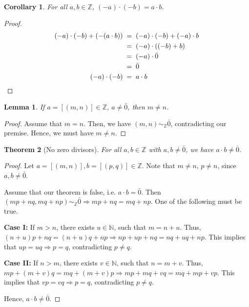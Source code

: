 \documentclass[10pt]{article}
\newtheorem{theorem}{Theorem}[section]
\newtheorem{lemma}[theorem]{Lemma}
\newtheorem{corollary}{Corollary}[theorem]
\theoremstyle{definition}
\theoremstyle{remark}
\begin{document}
        \begin{corollary}
                For all $a, b \in \mathbb{Z}$, $(-a)\cdot(-b) = a\cdot b$.
        \end{corollary}
        \begin{proof}
                \begin{align*}
                        (-a)\cdot(-b) + (-(a\cdot b)) \;&=\; (-a)\cdot(-b) + (-a)\cdot b\\
                                \;&=\; (-a)\cdot((-b) + b) \\
                                \;&=\; (-a)\cdot \bar{0} \\
                                \;&=\; \bar{0}\\
                        (-a)\cdot(-b) \;&=\; a\cdot b \qedhere
                \end{align*}
        \end{proof}

        \begin{lemma}
                If $a = [(m, n)] \in \mathbb{Z}$, $a \neq \bar{0}$, then $m \neq n$.
        \end{lemma}
        \begin{proof}
                Assume that $m = n$. Then, we have $(m, n) \sim_{\mathbb{Z}} \bar{0}$,
                contradicting our premise. Hence, we must have $m\neq n$.
        \end{proof}
        \begin{theorem}[No zero divisors]
                For all $a, b \in \mathbb{Z}$ with $a,b \neq \bar{0}$, we have $a\cdot b \neq \bar{0}$.
        \end{theorem}
        \begin{proof}
                Let $a = [(m, n)], b = [(p, q)] \in \mathbb{Z}$.
                Note that $m\neq n$, $p\neq n$, since $a, b \neq \bar{0}$.

                Assume that our theorem is false, i.e. $a\cdot b = \bar{0}$.
                Then $(mp + nq, mq + np) \sim_{\mathbb{Z}} \bar{0} \Rightarrow mp + nq = mq + np$.
                One of the following must be true.
                
                \par\textbf{Case I:} If $m > n$, there exists $u \in \mathbb{N}$, such that $m = n + u$. Thus, $(n + u)p + nq = (n + u)q + np \Rightarrow np + up + nq = nq + uq + np$.
                This implies that $up = uq \Rightarrow p = q$, contradicting $p\neq q$.
                \par\textbf{Case II:} If $n > m$, there exists $v \in \mathbb{N}$, such that $n = m + v$. Thus, $mp + (m + v)q = mq + (m + v)p\Rightarrow mp + mq + vq = mq + mp + vp$.
                This implies that $vp = vq \Rightarrow p = q$, contradicting $p\neq q$.

                Hence, $a\cdot b \neq \bar{0}$.
        \end{proof}
\end{document}
